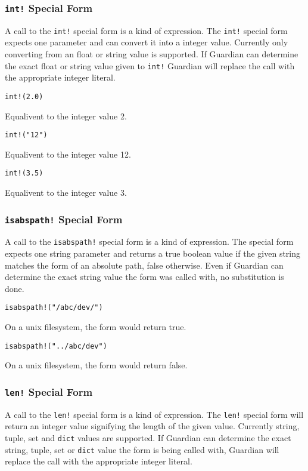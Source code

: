 {	\subsubsection{\texttt{int!} Special Form}
	{
		A call to the \texttt{int!} special form is a kind of expression.
		The \texttt{int!} special form expects one parameter and can convert it
		into a integer value. Currently only converting from an float or string
		value is supported.
		If Guardian can determine the exact float or string value given to
		\texttt{int!} Guardian will replace the call with the appropriate
		integer literal.
		
		\begin{itemize}
		{
			\item[] \texttt{int!(2.0)}
			
				Equalivent to the integer value 2.
			
			\item[] \texttt{int!("12")}
			
				Equalivent to the integer value 12.
			
			\item[] \texttt{int!(3.5)}
			
				Equalivent to the integer value 3.
		}
		\end{itemize}
	}
	
	\subsubsection{\texttt{isabspath!} Special Form}
	{
		A call to the \texttt{isabspath!} special form is a kind of expression.
		The special form expects one string parameter and returns a true boolean
		value if the given string matches the form of an absolute path, false
		otherwise.
		Even if Guardian can determine the exact string value the form was
		called with, no substitution is done.
		
		\begin{itemize}
		{
			\item[] \texttt{isabspath!("/abc/dev/")}
			
				On a unix filesystem, the form would return true.
			
			\item[] \texttt{isabspath!("../abc/dev")}
			
				On a unix filesystem, the form would return false.
		}
		\end{itemize}
	}
	
	\subsubsection{\texttt{len!} Special Form}
	{
		A call to the \texttt{len!} special form is a kind of expression.
		The \texttt{len!} special form will return an integer value signifying
		the length of the given value. Currently string, tuple, set
		and \texttt{dict} values are supported.
		If Guardian can determine the exact string, tuple, set or \texttt{dict}
		value the form is being called with, Guardian will replace the call with
		the appropriate integer literal.
		
}}
